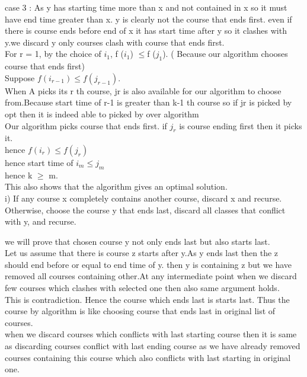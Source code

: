 \documentclass{extarticle}
\theoremstyle{remark}
\begin{document}
case 3 : As y  has starting time more than x and not contained in x so it must have end time greater than x. y is clearly not the course that ends first. even if there is course ends before end of x it has start time after y so it clashes with y.we discard y only courses clash with course that ends first.\\

For r = 1, by the choice of $i_1$, f ($i_1$) $\leq$f ($j_1$). ( Because our algorithm chooses course that ends first)\\ 

Suppose $f (i_{r-1}) \leq f (j_{r-1})$.\\

When A picks its r th course, jr 
is also available for our algorithm to choose from.Because start time of r-1 is greater than k-1 th course so if jr is picked by opt then it is indeed able to picked by over algorithm \\
Our algorithm picks course that ends first. if  $j_r$ is course ending first then it picks it.\\
hence $f (i_{r}) \leq f (j_{r})$\\

hence start time of $ i_m \leq j_m $\\
hence k $\geq$ m.\\
This also shows that the algorithm  gives an optimal solution.\\


i) If any course x completely contains another course, discard x and
recurse. Otherwise, choose the course y that ends last, discard all classes
that conflict with y, and recurse.
    
    we will prove that chosen course y not only ends last but also starts last.\\
    
Let us assume that there is course  z starts after y.As y ends last then the z should end before or equal to end time of y. then y is containing z but we have removed all courses containing other.At any intermediate point when we discard few courses which clashes with selected one then also same argument holds.\\

This is contradiction. Hence the course which  ends last is starts last.
Thus  the course by algorithm is like choosing course that ends last in original list of courses.\\

when we discard courses which conflicts with last starting course then it is same as discarding courses conflict with last ending course as we have already removed courses containing this course which also conflicts with last starting in original one.  
\end{document}
